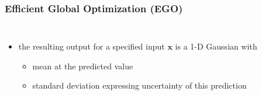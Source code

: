 \documentclass[sans,mathserif]{beamer}
\newcommand{\xx}{\mathrm{\mathbf{x}}}
\newcommand{\blue}[1]{{\color{blue} #1}}
\begin{document}
\begin{frame}
  \frametitle{Efficient Global Optimization (EGO)}
  \begin{columns}[T]
  \column{5cm}
    \begin{itemize}
      \item the resulting output for a specified input $\xx$ is a 1-D Gaussian with
        \begin{itemize}
          \item \blue{mean} at the predicted value
          \item \blue{standard deviation} expressing uncertainty of this prediction
        \end{itemize}
    \end{itemize}
  \column{5.5cm}
\end{columns}
\end{frame}
\end{document}
